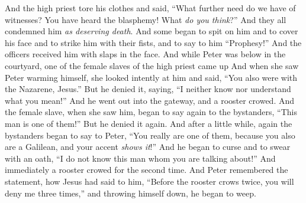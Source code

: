\begin{biblechapter}
\verse And the high priest tore his clothes and said, “What further need do we have of witnesses?
\verse You have heard the blasphemy! What \textit{do you think}?” And they all condemned him \textit{as deserving death}.
\verse And some began to spit on him and to cover his face and to strike him with their fists, and to say to him “Prophesy!” And the officers received him with slaps in the face.
 And while Peter was below in the courtyard, one of the female slaves of the high priest came up
\verse And when she saw Peter warming himself, she looked intently at him and said, “You also were with the Nazarene, Jesus.”
\verse But he denied it, saying, “I neither know nor understand what you mean!” And he went out into the gateway, and a rooster crowed.
\verse And the female slave, when she saw him, began to say again to the bystanders, “This man is one of them!”
\verse But he denied it again. And after a little while, again the bystanders began to say to Peter, “You really are one of them, because you also are a Galilean, and your accent \textit{shows it}!”
\verse And he began to curse and to swear with an oath, “I do not know this man whom you are talking about!”
\verse And immediately a rooster crowed for the second time. And Peter remembered the statement, how Jesus had said to him, “Before the rooster crows twice, you will deny me three times,” and throwing himself down, he began to weep.
\end{biblechapter}

